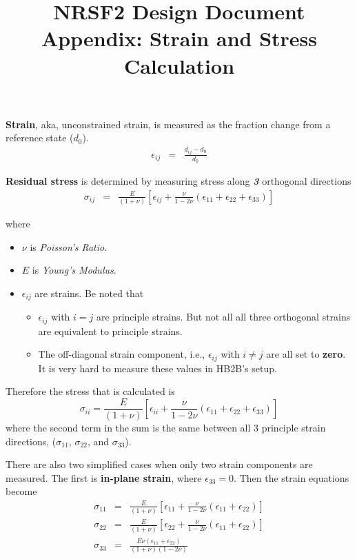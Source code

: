\documentclass[12pt]{report}  %
\title{NRSF2 Design Document Appendix: Strain and Stress Calculation}
\begin{document}

{\bf Strain}, aka, unconstrained strain, is measured as the fraction change from a reference state ($d_0$).
\begin{eqnarray}
\epsilon_{ij} &=& \frac{d_{ij} - d_0}{d_0}
\end{eqnarray}

{\bf Residual stress} is determined by measuring stress along {\bf\it 3} orthogonal directions
\begin{eqnarray}
\sigma_{ij} &=&
	\frac{E}{(1 + \nu)}\left[\epsilon_{ij} + \frac{\nu}{1-2\nu}(\epsilon_{11} + \epsilon_{22} + \epsilon_{33})\right]
\end{eqnarray}

where
\begin{itemize}
\item $\nu$ is {\it Poisson's Ratio}.
\item $E$ is {\it Young's Modulus}.
\item $\epsilon_{ij}$ are strains.  Be noted that
	\begin{itemize}
	\item  $\epsilon_{ij}$ with $i = j$ are principle strains.  But not all all three orthogonal strains are equivalent to principle strains.
	\item The off-diagonal strain component, i.e., $\epsilon_{ij}$ with $i\neq j$ are all set to {\bf zero}.  It is very hard to measure these values in HB2B's setup.
	\end{itemize}
\end{itemize}

Therefore the stress that is calculated is
%
\begin{equation}
\sigma_{ii} =
	\frac{E}{(1 + \nu)}\left[\epsilon_{ii} + \frac{\nu}{1-2\nu}(\epsilon_{11} + \epsilon_{22} + \epsilon_{33})\right]
\end{equation}
%
where the second term in the sum is the same between all 3 principle strain directions, ($\sigma_{11}$, $\sigma_{22}$, and $\sigma_{33}$).

There are also two simplified cases when only two strain components are measured. The first is {\bf in-plane strain}, where $\epsilon_{33}=0$. Then the strain equations become
%
\begin{eqnarray}
\sigma_{11} &=&
	\frac{E}{(1 + \nu)}\left[\epsilon_{11} + \frac{\nu}{1-2\nu}(\epsilon_{11} + \epsilon_{22})\right] \\
\sigma_{22} &=&
	\frac{E}{(1 + \nu)}\left[\epsilon_{22} + \frac{\nu}{1-2\nu}(\epsilon_{11} + \epsilon_{22})\right] \\
\sigma_{33} &=&
	\frac{E \nu (\epsilon_{11} + \epsilon_{22})}{(1 + \nu)(1-2\nu)}
\end{eqnarray}
\end{document}
